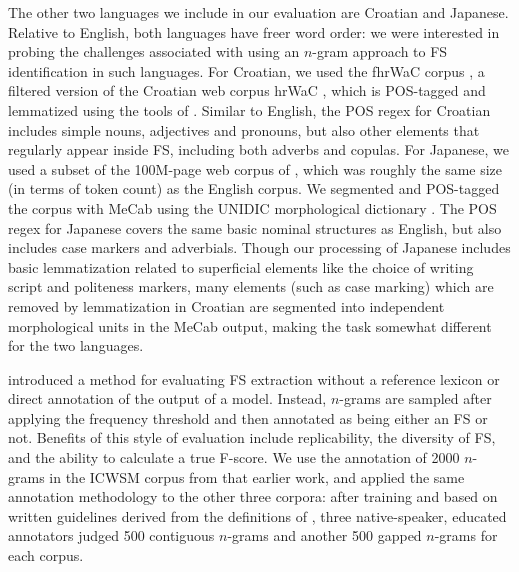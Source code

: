 \documentclass[11pt,letterpaper]{article}
\begin{document}
The other two languages we include in our evaluation are Croatian and Japanese. Relative to English, both languages have freer word order: we were interested in probing the challenges associated with using an $n$-gram approach to FS identification in such languages. For Croatian, we used the fhrWaC corpus \cite{snajder2013building}, a filtered version of the Croatian web corpus hrWaC \cite{ljubesic2014bs}, which is POS-tagged and lemmatized using the tools of . Similar to English, the POS regex for Croatian includes simple nouns, adjectives and pronouns, but also other elements that regularly appear inside FS, including both adverbs and copulas. For Japanese, we used a subset of the 100M-page web corpus of , which was roughly the same size (in terms of token count) as the English corpus. We segmented and POS-tagged the corpus with MeCab \cite{Kudo:2008} using the UNIDIC morphological dictionary \cite{Den:2007}. The POS regex for Japanese covers the same basic nominal structures as English, but also includes case markers and adverbials. Though our processing of Japanese includes basic lemmatization related to superficial elements like the choice of writing script and politeness markers, many elements (such as case marking) which are removed by lemmatization in Croatian are segmented into independent morphological units in the MeCab output, making the task somewhat different for the two languages.

 introduced a method for evaluating FS extraction without a reference lexicon or direct annotation of the output of a model. Instead, $n$-grams are sampled after applying the frequency threshold and then annotated as being either an FS or not. Benefits of this style of evaluation include replicability, the diversity of FS, and the ability to calculate a true F-score.  We use the annotation of 2000 $n$-grams in the ICWSM corpus from that earlier work, and applied the same annotation methodology to the other three corpora: after training and based on written guidelines derived from the definitions of , three native-speaker, educated annotators judged 500 contiguous $n$-grams and another 500 gapped $n$-grams for each corpus. 
\end{document}
